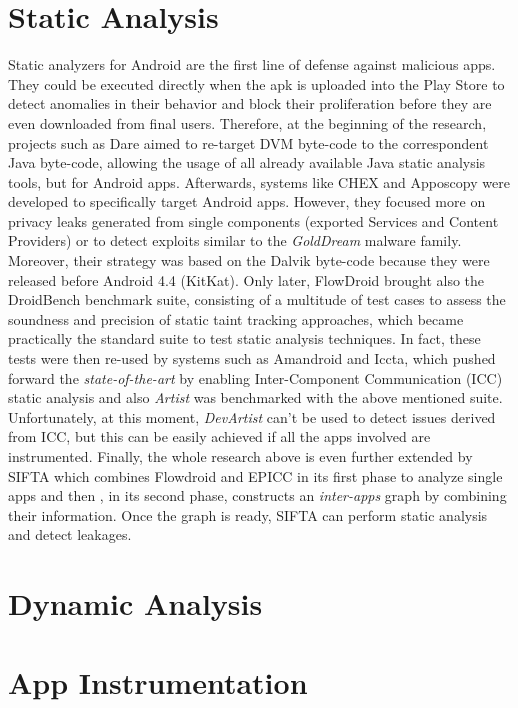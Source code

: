 \section{Static Analysis}
Static analyzers for Android are the first line of defense against malicious apps. They could be executed directly when the apk is uploaded into the Play Store to detect anomalies in their behavior and block their proliferation before they are even downloaded from final users. Therefore, at the beginning of the research, projects such as Dare\cite{dare} aimed to re-target DVM byte-code to the correspondent Java byte-code, allowing the usage of all already available Java static analysis tools, but for Android apps. Afterwards, systems like CHEX\cite{chex} and Apposcopy\cite{apposcopy} were developed to specifically target Android apps. However, they focused more on privacy leaks generated from single components (exported Services and Content Providers) or to detect exploits similar to the \emph{GoldDream}\cite{golddream} malware family. Moreover, their strategy was based on the Dalvik byte-code because they were released before  Android 4.4 (KitKat). Only later, FlowDroid\cite{flowdroid} brought also the DroidBench benchmark suite, consisting of a multitude of test cases to assess the soundness and precision of static taint tracking approaches, which became practically the standard suite to test static analysis techniques. In fact, these tests were then re-used by systems such as Amandroid\cite{amandroid} and Iccta\cite{iccta}, which pushed forward the \emph{state-of-the-art} by enabling Inter-Component Communication (ICC) static analysis and also \emph{Artist}\cite{artist} was benchmarked with the above mentioned suite. Unfortunately, at this moment, \emph{DevArtist} can't be used to detect issues derived from ICC, but this can be easily achieved if all the apps involved are instrumented. Finally, the whole research above is even further extended by SIFTA\cite{sifta} which combines Flowdroid and EPICC\cite{EPICC} in its first phase to analyze single apps and then , in its second phase, constructs an \emph{inter-apps} graph by combining their information. Once the graph is ready, SIFTA can perform static analysis and detect leakages. 

\section{Dynamic Analysis}



\section{App Instrumentation}


